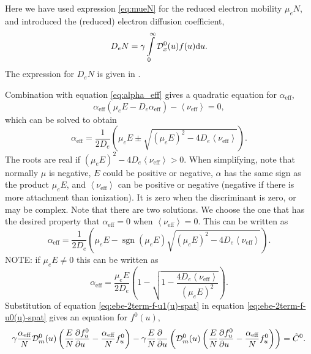 \documentclass{book}
\newcommand{\MEAN}[1]{\ensuremath{\!\left\langle{{#1}}\right\rangle}}
\DeclareMathOperator{\sgn}{sgn}
\begin{document}
Here we have used expression \eqref{eq:mueN} for the reduced electron mobility
$\mu_eN$, and introduced the (reduced) electron diffusion coefficient,
\begin{equation}
	D_eN   = \gamma\int\limits_0^\infty {\cal D}_x^0(u)f(u)\mathrm{d}{{u}}.
	\label{eq:DeN}
\end{equation}
The expression for $D_eN$ is given in \cite[eq. 46a]{Manual_2_2_0}.

Combination with equation \eqref{eq:alpha_eff} gives a quadratic equation for $\alpha_{\text{eff}}$,
\begin{equation}
	\alpha_{\text{eff}}(\mu_eE-D_e\alpha_{\text{eff}}) - \MEAN{\nu_{\text{eff}}} =0,
\end{equation}
which can be solved to obtain
\begin{equation}
	\alpha_{\text{eff}} = \frac{1}{2D_e}\left(\mu_eE \pm\sqrt{(\mu_eE)^2-4D_e\MEAN{\nu_{\text{eff}}}}\right).
\end{equation}
The roots are real if $(\mu_eE)^2-4D_e\MEAN{\nu_{\text{eff}}}>0$. When simplifying,
note that normally $\mu$ is negative, $E$ could be positive or negative, $\alpha$ has the
same sign as the product $\mu_eE$, and $\MEAN{\nu_{\text{eff}}}$ can be positive or negative
(negative if there is more attachment than ionization).
It is zero when the discriminant is zero, or may be complex.
Note that there are two solutions. We choose the one that has the desired property that
$\alpha_{\text{eff}}=0$ when $\MEAN{\nu_{\text{eff}}}=0$. This can be written as
\begin{equation}
	\alpha_{\text{eff}} = \frac{1}{2D_e}\left(\mu_eE -\sgn(\mu_eE)\sqrt{(\mu_eE)^2-4D_e\MEAN{\nu_{\text{eff}}}}\right).
	\label{eq:sst-alpha-solution}
\end{equation}
NOTE: if $\mu_eE\neq 0$ this can be written as
\begin{equation}
	\alpha_{\text{eff}} = \frac{\mu_eE}{2D_e}\left(1 -\sqrt{1-\frac{4D_e\MEAN{\nu_{\text{eff}}}}{(\mu_eE)^2}}\right).
	\label{eq:sst-alpha-solution-muE!=0}
\end{equation}
Substitution of equation \eqref{eq:ebe-2term-f-u1(u)-spat} in equation \eqref{eq:ebe-2term-f-u0(u)-spat}
gives an equation for $f^0(u)$,
\begin{equation}
	  \gamma\frac{\alpha_{\text{eff}}}{N}{\cal D}_m^0(u)\left(\frac{E}{N}\PDEV{f^0_u}{u}
        - \frac{\alpha_{\text{eff}}}{N}f^0_u\right)
	- \gamma\frac{E}{N}\PDEV{}{u}\left(
		{\cal D}_m^0(u)\left(\frac{E}{N}\PDEV{f^0_u}{u}
		- \frac{\alpha_{\text{eff}}}{N}f^0_u\right)
	\right)
	= \tilde{C}^0.
	\label{eq:ebe-2term-f-u0(u)-spat-subst}
\end{equation}
\end{document}

